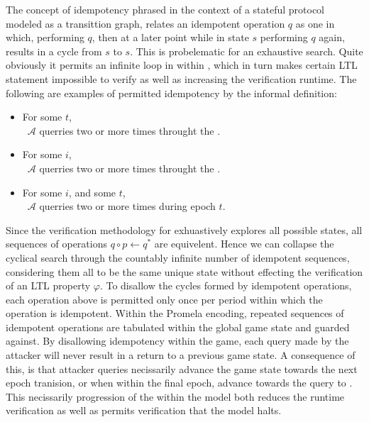 The concept of idempotency phrased in the context of a stateful protocol modeled as a transittion graph, relates an idempotent operation \(q\) as one in which, performing \(q\), then at a later point while in state \(s\) performing \(q\) again, results in a cycle from \(s\) to \(s\).
This is probelematic for an exhaustive search.
Quite obviously it permits an infinite loop in within \CGKAmod, which in turn makes certain LTL statement impossible to verify as well as increasing the verification runtime.
The following are examples of permitted idempotency by the informal \CGKAsec definition:

\begin{itemize}
  \item For some \(t\),\\~\hspace{4em}\(\mathcal{A}\) querries     two or more times throught the \CGKAsec.  
  \item For some \(i\),\\~\hspace{4em}\(\mathcal{A}\) querries  two or more times throught the \CGKAsec.
  \item For some \(i\), and some \(t\),\\~\hspace{4em}\(\mathcal{A}\) querries  two or more times during epoch \(t\).
\end{itemize}

Since the verification methodology for  exhuastively explores all possible \CGKAsec states, all sequences of operations \(q \circ p \gets q^{*}\) are equivelent.
Hence we can collapse the cyclical search through the countably infinite number of idempotent sequences, considering them all to be the same unique state without effecting the verification of an LTL property \(\varphi\).
To disallow the cycles formed by idempotent operations, each operation above is permitted only once per period within which the operation is idempotent.
Within the \CGKAmod Promela encoding, repeated sequences of idempotent operations are tabulated within the global game state and guarded against.
By disallowing idempotency within the game, each query made by the attacker will never result in a return to a previous game state.
A consequence of this, is that attacker queries necissarily advance the game state towards the next epoch tranision, or when within the final epoch, advance towards the query to .
This necissarily progression of the \CGKAsec within the model  both reduces the runtime verification as well as permits verification that the model  halts.


